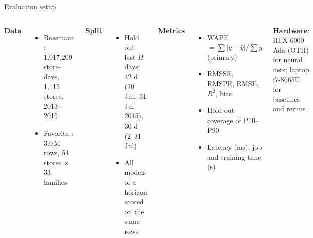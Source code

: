 \documentclass[aspectratio=169,11pt]{beamer}
\begin{document}
\begin{frame}{Evaluation setup}
\begin{columns}[T]
\textbf{Data}
\begin{itemize}\small
  \item Rossmann \cite{kaggle2015rossmann}: 1,017,209 store-days, 1,115 stores, 2013--2015
  \item Favorita \cite{kaggle2021storesales}: 3.0\,M rows, 54 stores $\times$ 33 families
\end{itemize}
\textbf{Split}
\begin{itemize}\small
  \item Hold out last $H$ days: 42 d (20 Jun--31 Jul 2015), 30 d (2--31 Jul)
  \item All models of a horizon scored on the same rows
\end{itemize}
\textbf{Metrics}
\begin{itemize}\small
  \item \alert{WAPE} $=\sum|y-\hat y|/\sum y$ (primary)
  \item RMSSE, RMSPE, RMSE, $R^2$, bias \cite{hyndman2006another}
  \item Hold-out coverage of P10--P90
  \item Latency (ms), job and training time (s)
\end{itemize}
\textbf{Hardware}: RTX 6000 Ada (OTH) for neural nets; laptop i7-8665U for baselines and reruns
\end{columns}
\end{frame}
\end{document}
